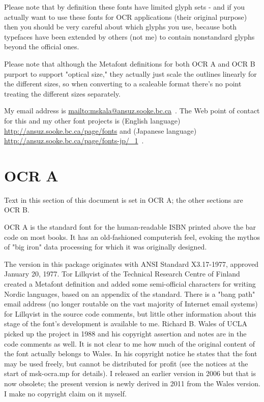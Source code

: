 \documentclass{article}
\begin{document}
Please note that by definition these fonts have limited glyph sets - and
if you actually want to use these fonts for OCR applications (their original
purpose) then you should be very careful about which glyphs you use, because
both typefaces have been extended by others (not me) to contain nonstandard
glyphs beyond the official ones.

Please note that although the Metafont definitions for both OCR A and OCR B
purport to support "optical size," they actually just scale the outlines
linearly for the different sizes, so when converting to a scaleable format
there's no point treating the different sizes separately.

My email address is \url{mailto:mskala@ansuz.sooke.bc.ca}~.  The Web point of
contact for this and my other font projects is (English language)
\url{http://ansuz.sooke.bc.ca/page/fonts} and (Japanese language)
\url{http://ansuz.sooke.bc.ca/page/fonts-jp/_1}~.

\setmainfont{OCRA.otf}
\setmonofont{OCRA.otf}
\section{OCR A}

Text in this section of this document is set in OCR A; the other sections
are OCR B.

OCR A is the standard font for the human-readable ISBN printed above the bar
code on most books.  It has an old-fashioned computerish feel, evoking the
mythos of "big iron" data processing for which it was originally designed.

The version in this package originates with ANSI Standard X3.17-1977,
approved January 20, 1977.  Tor Lillqvist of the Technical Research Centre
of Finland created a Metafont definition and added some semi-official
characters for writing Nordic languages, based on an appendix of the
standard.  There is a "bang path" email address (no longer routable on the
vast majority of Internet email systems) for Lillqvist in the source code
comments, but little other information about this stage of the font's
development is available to me.  Richard B. Wales of UCLA picked up the
project in 1988 and his copyright assertion and notes are in the code
comments as well.  It is not clear to me how much of the original content of
the font actually belongs to Wales.  In his copyright notice he states that
the font may be used freely, but cannot be distributed for profit (see the
notices at the start of msk-ocra.mp for details).
I released an earlier version in 2006
but that is now obsolete; the present version is newly derived in 2011 from
the Wales version.  I make no copyright claim on it myself.
\end{document}
